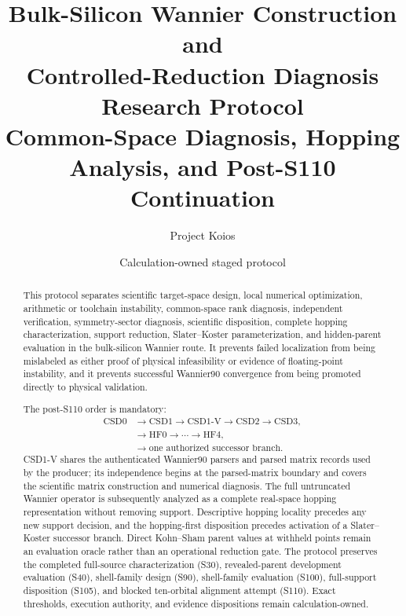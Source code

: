 \documentclass[11pt]{report}
\title{Bulk-Silicon Wannier Construction and\\Controlled-Reduction Diagnosis Research Protocol\\Common-Space Diagnosis, Hopping Analysis, and Post-S110 Continuation}
\author{Project Koios}
\date{Calculation-owned staged protocol}
\begin{document}
\maketitle

\begin{abstract}
This protocol separates scientific target-space design, local numerical optimization,
arithmetic or toolchain instability, common-space rank diagnosis, independent
verification, symmetry-sector diagnosis, scientific disposition, complete hopping
characterization, support reduction, Slater--Koster parameterization, and hidden-parent
evaluation in the bulk-silicon Wannier route.  It prevents failed localization from
being mislabeled as either proof of physical infeasibility or evidence of
floating-point instability, and it prevents successful Wannier90 convergence from being
promoted directly to physical validation.

The post-S110 order is mandatory:
\begin{align*}
 \mathrm{CSD0}&\longrightarrow\mathrm{CSD1}
 \longrightarrow\mathrm{CSD1\mbox{-}V}
 \longrightarrow\mathrm{CSD2}\longrightarrow\mathrm{CSD3},\\
 &\longrightarrow\mathrm{HF0}\longrightarrow\cdots
 \longrightarrow\mathrm{HF4},\\
 &\longrightarrow\text{one authorized successor branch}.
\end{align*}
CSD1-V shares the authenticated Wannier90 parsers and parsed matrix records used by the
producer; its independence begins at the parsed-matrix boundary and covers the
scientific matrix construction and numerical diagnosis.  The full untruncated Wannier
operator is subsequently analyzed as a complete real-space hopping representation
without removing support.  Descriptive hopping locality precedes any new support
decision, and the hopping-first disposition precedes activation of a Slater--Koster
successor branch.  Direct Kohn--Sham parent values at withheld points remain an
evaluation oracle rather than an operational reduction gate.  The protocol preserves
the completed full-source characterization (S30), revealed-parent development evaluation
(S40), shell-family design (S90), shell-family evaluation (S100), full-support disposition
(S105), and blocked ten-orbital alignment attempt (S110).  Exact thresholds, execution
authority, and evidence dispositions remain calculation-owned.
\end{abstract}

\tableofcontents
\clearpage
{}
\end{document}
